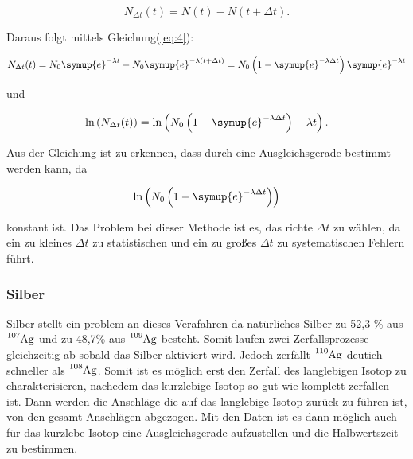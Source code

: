 \begin{equation}
   N_{\Delta t}(t) = N(t) - N(t + \Delta t) . \nonumber
\end{equation}

\noindent Daraus folgt mittels Gleichung(\ref{eq:4}):

\begin{equation}
   N_{\Delta t}(t) = N_0 \symup{e}^{ - \lambda t} - N_0 \symup{e}^{- \lambda \left( t + \Delta t \right) } = N_0 \left( 1 - \symup{e}^{-\lambda \Delta t} \right) \symup{e}^{-\lambda t} \nonumber
\end{equation}

\noindent und

\begin{equation}
   \text{ln} \left( N_{\Delta t}(t)\right) = \text{ln} \left( N_0 \left( 1- \symup{e}^{-\lambda \Delta t}\right) -\lambda t \right) .
\label{eq:5}
\end{equation}

\noindent Aus der Gleichung ist zu erkennen, dass \lambda durch eine Ausgleichsgerade bestimmt werden kann, da 

\begin{equation}
   \text{ln}\left(N_0\left(1- \symup{e}^{-\lambda\Delta t}\right)  \right) \nonumber
\end{equation}

\noindent konstant ist. Das Problem bei dieser Methode ist es, das richte $\Delta t$ zu wählen, da ein zu kleines $\Delta t$ zu statistischen und 
ein zu großes $\Delta t$ zu systematischen Fehlern führt.

\subsubsection{Silber}

\noindent Silber stellt ein problem an dieses Verafahren da natürliches Silber zu 52,3 \% aus $\ce{^{107}\text{Ag}}$ und zu 48,7\% aus $\ce{^{109}\text{Ag}}$ 
besteht. Somit laufen zwei Zerfallsprozesse gleichzeitig ab sobald das Silber aktiviert wird. Jedoch zerfällt $\ce{^{110}\text{Ag}}$ deutich schneller 
als $\ce{^{108}\text{Ag}}$. Somit ist es möglich erst den Zerfall des langlebigen Isotop zu charakterisieren, nachedem das kurzlebige Isotop so gut 
wie komplett zerfallen ist. Dann werden die Anschläge die auf das langlebige Isotop zurück zu führen ist, von den gesamt Anschlägen abgezogen. Mit 
den Daten ist es dann möglich auch für das kurzlebe Isotop eine Ausgleichsgerade aufzustellen und die Halbwertszeit zu bestimmen.

